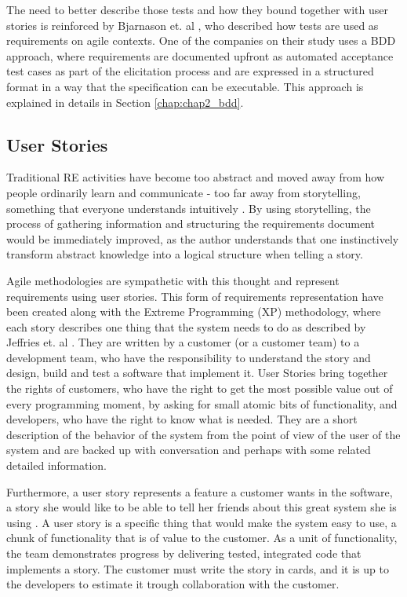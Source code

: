 The need to better describe those tests and how they bound together with user stories is reinforced by Bjarnason et. al \cite{Bjarnason_et_dot_al_2016}, who described how tests are used as requirements on agile contexts. One of the companies on their study uses a BDD approach, where requirements are documented upfront as automated acceptance test cases as part of the elicitation process and are expressed in a structured format in a way that the specification can be executable. This approach is explained in details in Section \ref{chap:chap2_bdd}.

\subsection{\label{chap:chap2_user_stories}User Stories}

Traditional RE activities have become too abstract and moved away from how people ordinarily learn and communicate - too far away from storytelling, something that everyone understands intuitively \cite{Rinzler_2009}. By using storytelling, the process of gathering information and structuring the requirements document would be immediately improved, as the author understands that one instinctively transform abstract knowledge into a logical structure when telling a story. 

Agile methodologies are sympathetic with this thought and represent requirements using user stories. This form of requirements representation have been created along with the Extreme Programming (XP) methodology, where each story describes one thing that the system needs to do as described by Jeffries et. al \cite{Jeffries_et_dot_al_2000}. They are written by a customer (or a customer team) to a development team, who have the responsibility to understand the story and design, build and test a software that implement it. User Stories bring together the rights of customers, who have the right to get the most possible value out of every programming moment, by asking for small atomic bits of functionality, and developers, who have the right to know what is needed. They are a short description of the behavior of the system from the point of view of the user of the system and are backed up with conversation and perhaps with some related detailed information. 

Furthermore, a user story represents a feature a customer wants in the software, a story she would like to be able to tell her friends about this great system she is using \cite{Beck_Fowler_2000}. A user story is a specific thing that would make the system easy to use, a chunk of functionality that is of value to the customer. As a unit of functionality, the team demonstrates progress by delivering tested, integrated code that implements a story. The customer must write the story in cards, and it  is up to the developers to estimate it trough collaboration with the customer.

